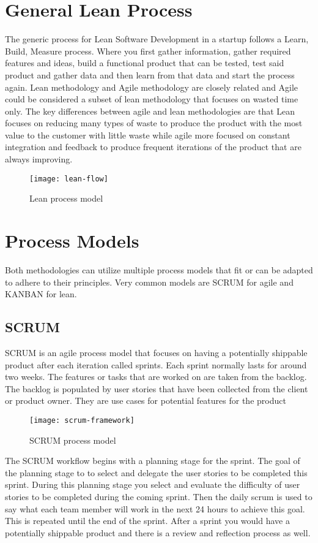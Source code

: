 \section{General Lean Process}
The generic process for Lean Software Development in a startup follows a Learn, Build, Measure process. Where you first gather information, gather required features and ideas, build a functional product that can be tested, test said product and gather data and then learn from that data and start the process again. Lean methodology and Agile methodology are closely related and Agile could be considered a subset of lean methodology that focuses on wasted time only. The key differences between agile and lean methodologies are that Lean focuses on reducing many types of waste to produce the product with the most value to the customer with little waste while agile more focused on constant integration and feedback to produce frequent iterations of the product that are always improving.

\begin{figure}[h]
\centering
\texttt{[image: lean-flow]}
\caption{Lean process model}
\end{figure}

\section{Process Models}

Both methodologies can utilize multiple process models that fit or can be adapted to adhere to their principles. Very common models are SCRUM for agile and KANBAN for lean.

\subsection{SCRUM}
SCRUM is an agile process model that focuses on having a potentially shippable product after each iteration called sprints. Each sprint normally lasts for around two weeks. The features or tasks that are worked on are taken from the backlog. The backlog is populated by user stories that have been collected from the client or product owner. They are use cases for potential features for the product

\begin{figure}[h]
\centering
\texttt{[image: scrum-framework]}
\caption{SCRUM process model}
\end{figure}

The SCRUM workflow begins with a planning stage for the sprint. The goal of the planning stage to to select and delegate the user stories to be completed this sprint. During this planning stage you select and evaluate the difficulty of user stories to be completed during the coming sprint. Then the daily scrum is used to say what each team member will work in the next 24 hours to achieve this goal. This is repeated until the end of the sprint. After a sprint you would have a potentially shippable product and there is a review and reflection process as well.


